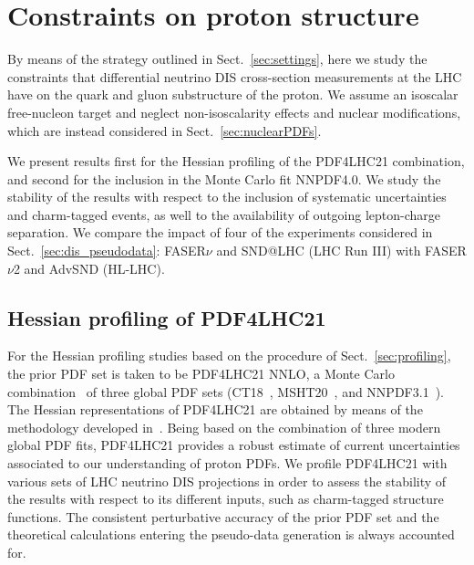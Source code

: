 \section{Constraints on proton structure}
\label{sec:protonPDFs}

By means of the strategy outlined in Sect.~\ref{sec:settings}, here we study the constraints that differential neutrino DIS
cross-section measurements at the LHC have on the quark and gluon substructure of the proton.
%
We assume an isoscalar free-nucleon target and neglect non-isoscalarity effects and nuclear modifications,
which are instead considered in Sect.~\ref{sec:nuclearPDFs}.

We present results first for the Hessian profiling of the PDF4LHC21 combination,
and second for the inclusion in the Monte Carlo fit NNPDF4.0.
%
We study the stability of the results with respect to the inclusion of systematic uncertainties
and  charm-tagged events, as well to the availability of outgoing lepton-charge separation.
%
We compare the impact of four of the experiments considered in Sect.~\ref{sec:dis_pseudodata}:
FASER$\nu$ and SND@LHC (LHC Run III) with FASER$\nu$2 and AdvSND (HL-LHC).

\subsection{Hessian profiling of PDF4LHC21}
\label{sec:pdf4lhc21}

For the Hessian profiling studies based on the procedure of Sect.~\ref{sec:profiling}, the prior PDF set is taken to
be PDF4LHC21 NNLO, a Monte Carlo combination~\cite{Watt:2012tq,Carrazza:2015hva} of three global PDF sets (CT18~\cite{Hou:2019efy},
MSHT20~\cite{Bailey:2020ooq}, and NNPDF3.1~\cite{NNPDF:2017mvq}).
%
The Hessian representations of PDF4LHC21 are obtained by means of the methodology developed in~\cite{Gao:2013bia,Carrazza:2015aoa}.
%
Being based on the combination of three modern global PDF fits, PDF4LHC21 provides a robust estimate
of  current uncertainties associated to our understanding of proton PDFs.
%
We profile PDF4LHC21 with various sets of LHC neutrino DIS projections in order to assess the stability
of the results with respect to its different inputs, such as charm-tagged structure functions.
%
The consistent perturbative accuracy of the prior PDF set and the theoretical calculations entering
the pseudo-data generation is always accounted for.

